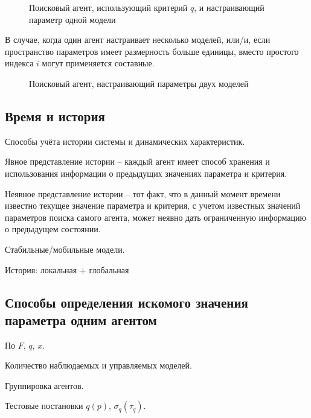 \begin{figure}[htb!]
\begin{center}

\end{center}
\caption{Поисковый агент, использующий критерий $q$, и настраивающий параметр одной модели}
\label{atu:f:agent1q}
\end{figure}


В случае, когда один агент настраивает несколько моделей,
или/и, если пространство параметров имеет размерность больше единицы,
вместо простого индекса $i$ могут применяется составные.

\begin{figure}[htb!]
\begin{center}

\end{center}
\caption{Поисковый агент, настраивающий параметры двух моделей}
\label{atu:f:agent2}
\end{figure}




\subsection{Время и история}  %

Способы учёта истории системы и динамических характеристик.

Явное представление истории -- каждый агент имеет способ хранения и использования
информации о предыдущих значениях параметра и критерия.

Неявное представление истории -- тот факт, что в данный момент времени известно
текущее значение параметра и критерия, с учетом известных значений
параметров поиска самого агента, может неявно дать ограниченную информацию
о предыдущем состоянии.

Стабильные/мобильные модели.

История: локальная + глобальная



\subsection{ Способы определения искомого значения параметра одним агентом }  %

По $F$, $q$, $x$.

Количество наблюдаемых и управляемых моделей.

Группировка агентов.

Тестовые постановки $q(p)$, $\sigma_q(\tau_q)$.


